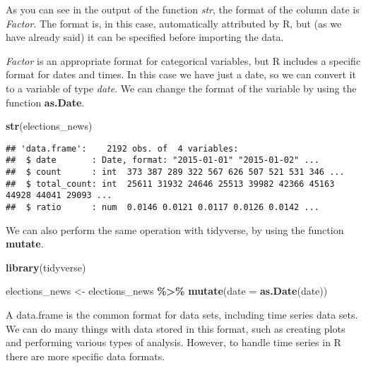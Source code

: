\documentclass[
]{article}
\newenvironment{Shaded}{\begin{snugshade}}{\end{snugshade}}
\newcommand{\AttributeTok}[1]{\textcolor[rgb]{0.13,0.29,0.53}{#1}}
\newcommand{\FunctionTok}[1]{\textcolor[rgb]{0.13,0.29,0.53}{\textbf{#1}}}
\newcommand{\NormalTok}[1]{#1}
\newcommand{\OtherTok}[1]{\textcolor[rgb]{0.56,0.35,0.01}{#1}}
\newcommand{\SpecialCharTok}[1]{\textcolor[rgb]{0.81,0.36,0.00}{\textbf{#1}}}
\begin{document}
As you can see in the output of the function \emph{str}, the format of the column date is \emph{Factor}. The format is, in this case, automatically attributed by R, but (as we have already said) it can be specified before importing the data.

\emph{Factor} is an appropriate format for categorical variables, but R includes a specific format for dates and times. In this case we have just a date, so we can convert it to a variable of type \emph{date}. We can change the format of the variable by using the function \textbf{as.Date}.

\begin{Shaded}
\end{Shaded}

\begin{Shaded}
\begin{Highlighting}[]
\FunctionTok{str}\NormalTok{(elections\_news)}
\end{Highlighting}
\end{Shaded}

\begin{verbatim}
## 'data.frame':    2192 obs. of  4 variables:
##  $ date       : Date, format: "2015-01-01" "2015-01-02" ...
##  $ count      : int  373 387 289 322 567 626 507 521 531 346 ...
##  $ total_count: int  25611 31932 24646 25513 39982 42366 45163 44928 44041 29093 ...
##  $ ratio      : num  0.0146 0.0121 0.0117 0.0126 0.0142 ...
\end{verbatim}

We can also perform the same operation with tidyverse, by using the function \textbf{mutate}.

\begin{Shaded}
\begin{Highlighting}[]
\FunctionTok{library}\NormalTok{(tidyverse)}

\NormalTok{elections\_news }\OtherTok{\textless{}{-}}\NormalTok{ elections\_news }\SpecialCharTok{\%\textgreater{}\%}
  \FunctionTok{mutate}\NormalTok{(}\AttributeTok{date =} \FunctionTok{as.Date}\NormalTok{(date))}
\end{Highlighting}
\end{Shaded}

A data.frame is the common format for data sets, including time series data sets. We can do many things with data stored in this format, such as creating plots and performing various types of analysis. However, to handle time series in R there are more specific data formats.
\end{document}
